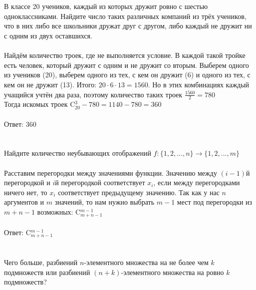 \documentclass{article}
\begin{document}
\section{}
В классе 20 учеников, каждый из которых дружит ровно с шестью одноклассниками. Найдите число таких различных компаний из трёх учеников, что в них либо все школьники дружат друг с другом, либо каждый не дружит ни с одним из двух оставшихся.\\\\
Найдём количество троек, где не выполняется условие. В каждой такой тройке есть человек, который дружит с одним и не дружит со вторым. Выберем одного из учеников (20), выберем одного из тех, с кем он дружит (6) и одного из тех, с кем он не дружит (13). Итого: $20\cdot6\cdot13=1560$. Но в этих комбинациях каждый учащийся учтён два раза, поэтому количество таких троек $\frac{1560}{2}=780$\\
Тогда искомых троек C$^3_{20}-780=1140-780=360$\\\\
Ответ: 360
\section{}
Найдите количество неубывающих отображений $f:\{1,2,...,n\} \rightarrow \{1,2,...,m\}$\\\\
Расставим перегородки между значениями функции. Значению между $(i-1)$й перегородкой и $i$й перегородкой соответствует $x_i$, если между перегородками ничего нет, то $x_i$ соответствует предыдущему значению. Так как у нас $n$ аргументов и $m$ значений, то нам нужно выбрать $m-1$ мест под перегородки из $m+n-1$ возможных: C$^{m-1}_{m+n-1}$\\\\
Ответ: C$^{m-1}_{m+n-1}$
\section{}
Чего больше, разбиений $n$-элементного множества на не более чем $k$ подмножеств или разбиений $(n+k)$-элементного множества на ровно $k$ подмножеств?\\\\
\end{document}
